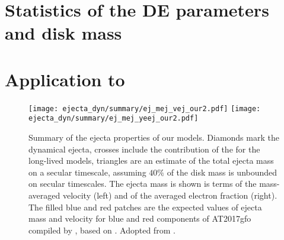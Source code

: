 









\section{Statistics of the \ac{DE} parameters and disk mass}



\section{Application to \GW{}}


\begin{figure*}[t]
    \centering 
    \texttt{[image: ejecta\_dyn/summary/ej\_mej\_vej\_our2.pdf]}
    \texttt{[image: ejecta\_dyn/summary/ej\_mej\_yeej\_our2.pdf]}
    \caption{
        Summary of the ejecta properties of our models.
        Diamonds mark the dynamical ejecta, crosses include the
        contribution of the \swind{} for the long-lived models, 
        triangles are an estimate of the total ejecta mass on a secular
        timescale, assuming $40\%$ of the disk mass is unbounded on
        secular timescales.         
        The ejecta mass is shown is terms of the mass-averaged velocity
        (left) and of the averaged electron fraction (right).
        The filled blue and red patches are the expected values of
        ejecta mass and velocity for blue and red components of
        AT2017gfo compiled by \cite{Siegel:2019mlp}, based on
        \cite{Villar:2017wcc}. 
        Adopted from \citet{Nedora:2020pak}.
    }
    \label{fig:ejecta:dyn:ds_sww}
\end{figure*}



